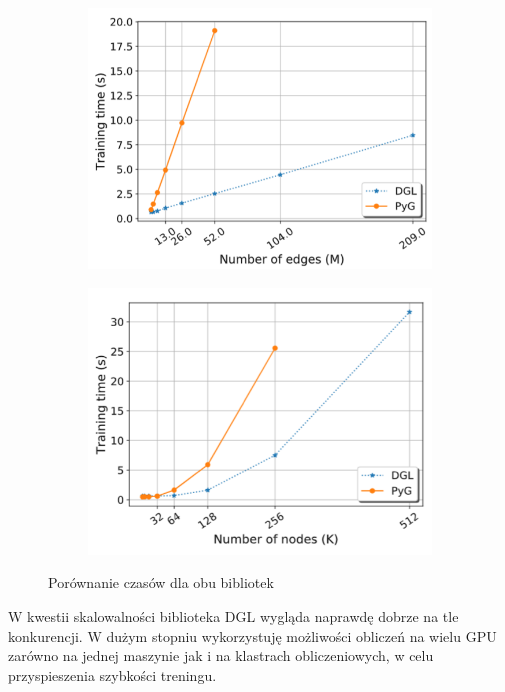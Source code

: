 \documentclass{article}
\begin{document}
\begin{figure}
\centering
\begin{subfigure}{.5\textwidth}
  \centering
  \includegraphics[width=0.9\linewidth]{images/DGLvsPyG-time1}
  \label{fig:sub1}
\end{subfigure}%
\begin{subfigure}{.5\textwidth}
  \centering
  \includegraphics[width=0.9\linewidth]{images/DGLvsPyG-time2}
  \label{fig:sub2}
\end{subfigure}
\caption{Porównanie czasów dla obu bibliotek}
\label{fig:test}
\end{figure}

W kwestii skalowalności biblioteka DGL wygląda naprawdę dobrze na tle konkurencji. W dużym stopniu wykorzystuję możliwości obliczeń na wielu GPU zarówno na jednej maszynie jak i na klastrach obliczeniowych, w celu przyspieszenia szybkości treningu. 
\end{document}
